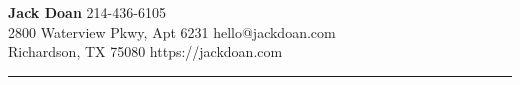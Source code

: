 \textbf{\Large Jack Doan}
\hfill
214-436-6105\\
2800 Waterview Pkwy, Apt 6231
\hfill
hello@jackdoan.com \\
Richardson, TX 75080
\hfill
https://jackdoan.com \\
\textcolor[RGB]{220,220,220}{\rule{\linewidth}{0.2pt}}

\vspace{0.5em}
